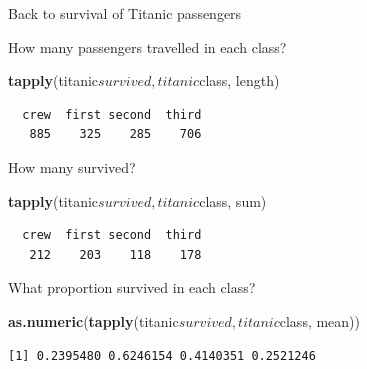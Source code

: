 \documentclass[10pt,ignorenonframetext,]{beamer}
\newenvironment{Shaded}{\begin{snugshade}}{\end{snugshade}}
\newcommand{\KeywordTok}[1]{\textcolor[rgb]{0.13,0.29,0.53}{\textbf{{#1}}}}
\newcommand{\NormalTok}[1]{{#1}}
\begin{document}
\begin{frame}[fragile]{Back to survival of Titanic passengers}

How many passengers travelled in each class?

\begin{Shaded}
\begin{Highlighting}[]
\KeywordTok{tapply}\NormalTok{(titanic$survived, titanic$class, length)}
\end{Highlighting}
\end{Shaded}

\begin{verbatim}
  crew  first second  third 
   885    325    285    706 
\end{verbatim}

How many survived?

\begin{Shaded}
\begin{Highlighting}[]
\KeywordTok{tapply}\NormalTok{(titanic$survived, titanic$class, sum)}
\end{Highlighting}
\end{Shaded}

\begin{verbatim}
  crew  first second  third 
   212    203    118    178 
\end{verbatim}

What proportion survived in each class?

\begin{Shaded}
\begin{Highlighting}[]
\KeywordTok{as.numeric}\NormalTok{(}\KeywordTok{tapply}\NormalTok{(titanic$survived, titanic$class, mean))}
\end{Highlighting}
\end{Shaded}

\begin{verbatim}
[1] 0.2395480 0.6246154 0.4140351 0.2521246
\end{verbatim}

\end{frame}
\end{document}

